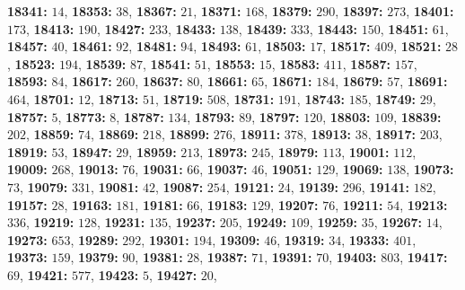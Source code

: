 \textsf{\bfseries 18341:} $14$, \textsf{\bfseries 18353:} $38$, \textsf{\bfseries 18367:} $21$, \textsf{\bfseries 18371:} $168$, \textsf{\bfseries 18379:} $290$, \textsf{\bfseries 18397:} $273$, \textsf{\bfseries 18401:} $173$, \textsf{\bfseries 18413:} $190$, \textsf{\bfseries 18427:} $233$, \textsf{\bfseries 18433:} $138$, \textsf{\bfseries 18439:} $333$, \textsf{\bfseries 18443:} $150$, \textsf{\bfseries 18451:} $61$, \textsf{\bfseries 18457:} $40$, \textsf{\bfseries 18461:} $92$, \textsf{\bfseries 18481:} $94$, \textsf{\bfseries 18493:} $61$, \textsf{\bfseries 18503:} $17$, \textsf{\bfseries 18517:} $409$, \textsf{\bfseries 18521:} $28$, \textsf{\bfseries 18523:} $194$, \textsf{\bfseries 18539:} $87$, \textsf{\bfseries 18541:} $51$, \textsf{\bfseries 18553:} $15$, \textsf{\bfseries 18583:} $411$, \textsf{\bfseries 18587:} $157$, \textsf{\bfseries 18593:} $84$, \textsf{\bfseries 18617:} $260$, \textsf{\bfseries 18637:} $80$, \textsf{\bfseries 18661:} $65$, \textsf{\bfseries 18671:} $184$, \textsf{\bfseries 18679:} $57$, \textsf{\bfseries 18691:} $464$, \textsf{\bfseries 18701:} $12$, \textsf{\bfseries 18713:} $51$, \textsf{\bfseries 18719:} $508$, \textsf{\bfseries 18731:} $191$, \textsf{\bfseries 18743:} $185$, \textsf{\bfseries 18749:} $29$, \textsf{\bfseries 18757:} $5$, \textsf{\bfseries 18773:} $8$, \textsf{\bfseries 18787:} $134$, \textsf{\bfseries 18793:} $89$, \textsf{\bfseries 18797:} $120$, \textsf{\bfseries 18803:} $109$, \textsf{\bfseries 18839:} $202$, \textsf{\bfseries 18859:} $74$, \textsf{\bfseries 18869:} $218$, \textsf{\bfseries 18899:} $276$, \textsf{\bfseries 18911:} $378$, \textsf{\bfseries 18913:} $38$, \textsf{\bfseries 18917:} $203$, \textsf{\bfseries 18919:} $53$, \textsf{\bfseries 18947:} $29$, \textsf{\bfseries 18959:} $213$, \textsf{\bfseries 18973:} $245$, \textsf{\bfseries 18979:} $113$, \textsf{\bfseries 19001:} $112$, \textsf{\bfseries 19009:} $268$, \textsf{\bfseries 19013:} $76$, \textsf{\bfseries 19031:} $66$, \textsf{\bfseries 19037:} $46$, \textsf{\bfseries 19051:} $129$, \textsf{\bfseries 19069:} $138$, \textsf{\bfseries 19073:} $73$, \textsf{\bfseries 19079:} $331$, \textsf{\bfseries 19081:} $42$, \textsf{\bfseries 19087:} $254$, \textsf{\bfseries 19121:} $24$, \textsf{\bfseries 19139:} $296$, \textsf{\bfseries 19141:} $182$, \textsf{\bfseries 19157:} $28$, \textsf{\bfseries 19163:} $181$, \textsf{\bfseries 19181:} $66$, \textsf{\bfseries 19183:} $129$, \textsf{\bfseries 19207:} $76$, \textsf{\bfseries 19211:} $54$, \textsf{\bfseries 19213:} $336$, \textsf{\bfseries 19219:} $128$, \textsf{\bfseries 19231:} $135$, \textsf{\bfseries 19237:} $205$, \textsf{\bfseries 19249:} $109$, \textsf{\bfseries 19259:} $35$, \textsf{\bfseries 19267:} $14$, \textsf{\bfseries 19273:} $653$, \textsf{\bfseries 19289:} $292$, \textsf{\bfseries 19301:} $194$, \textsf{\bfseries 19309:} $46$, \textsf{\bfseries 19319:} $34$, \textsf{\bfseries 19333:} $401$, \textsf{\bfseries 19373:} $159$, \textsf{\bfseries 19379:} $90$, \textsf{\bfseries 19381:} $28$, \textsf{\bfseries 19387:} $71$, \textsf{\bfseries 19391:} $70$, \textsf{\bfseries 19403:} $803$, \textsf{\bfseries 19417:} $69$, \textsf{\bfseries 19421:} $577$, \textsf{\bfseries 19423:} $5$, \textsf{\bfseries 19427:} $20$, 

